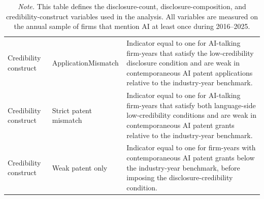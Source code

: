 \begin{table}[p]
\begin{tabularx}{\textwidth}{>{\raggedright\arraybackslash}p{}>{\raggedright\arraybackslash}p{}>{\raggedright\arraybackslash}X}
Credibility construct & ApplicationMismatch & Indicator equal to one for AI-talking firm-years that satisfy the low-credibility disclosure condition and are weak in contemporaneous AI patent applications relative to the industry-year benchmark. \\
Credibility construct & Strict patent mismatch & Indicator equal to one for AI-talking firm-years that satisfy both language-side low-credibility conditions and are weak in contemporaneous AI patent grants relative to the industry-year benchmark. \\
Credibility construct & Weak patent only & Indicator equal to one for firm-years with contemporaneous AI patent grants below the industry-year benchmark, before imposing the disclosure-credibility condition. \\
\hline
\end{tabularx}
\caption*{\footnotesize \textit{Note.} This table defines the disclosure-count, disclosure-composition, and credibility-construct variables used in the analysis. All variables are measured on the annual sample of firms that mention AI at least once during 2016--2025.}
\end{table}

